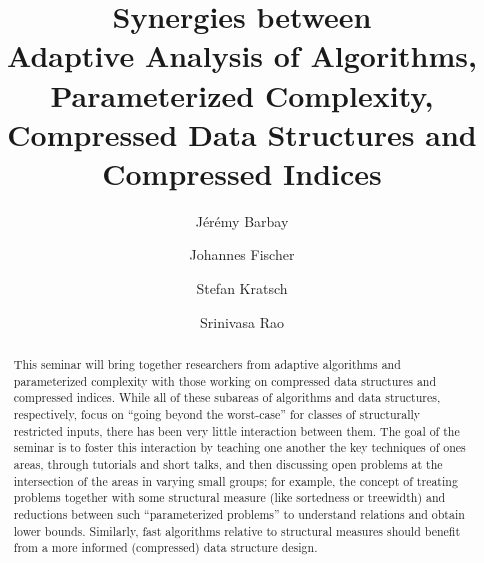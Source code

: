 \documentclass[a4paper,10pt]{article}
\begin{document}
\title{Synergies between \\ Adaptive Analysis of Algorithms, Parameterized Complexity, \\ Compressed Data Structures and Compressed Indices}


\author{J\'er\'emy Barbay \and Johannes Fischer \and Stefan Kratsch \and Srinivasa Rao }

\maketitle              %

\begin{abstract}
This seminar will bring together researchers from adaptive algorithms and parameterized complexity with those working on compressed data structures and compressed indices. While all of these subareas of algorithms and data structures, respectively, focus on ``going beyond the worst-case'' for classes of structurally restricted inputs, there has been very little interaction between them. The goal of the seminar is to foster this interaction by teaching one another the key techniques of ones areas, through tutorials and short talks, and then discussing open problems at the intersection of the areas in varying small groups; for example, the concept of treating problems together with some structural measure (like sortedness or treewidth) and reductions between such ``parameterized problems'' to understand relations and obtain lower bounds. Similarly, fast algorithms relative to structural measures should benefit from a more informed (compressed) data structure design.
\end{abstract}

\end{document}
